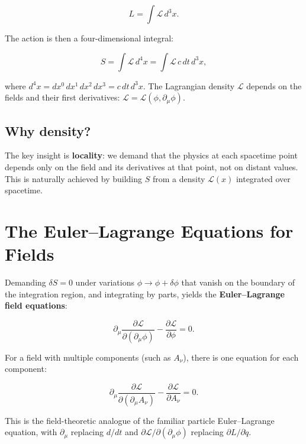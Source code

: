 \begin{equation}
L = \int \mathcal{L}\,d^3x.
\end{equation}

The action is then a four-dimensional integral:

\begin{equation}
\boxed{S = \int \mathcal{L}\,d^4x = \int \mathcal{L}\,c\,dt\,d^3x,}
\end{equation}

where $d^4x = dx^0\,dx^1\,dx^2\,dx^3 = c\,dt\,d^3x$. The Lagrangian density $\mathcal{L}$ depends on the fields and their first derivatives: $\mathcal{L} = \mathcal{L}(\phi, \partial_\mu\phi)$.

\subsection*{Why density?}

The key insight is \textbf{locality}: we demand that the physics at each spacetime point depends only on the field and its derivatives at that point, not on distant values. This is naturally achieved by building $S$ from a density $\mathcal{L}(x)$ integrated over spacetime.

\section{The Euler--Lagrange Equations for Fields}

Demanding $\delta S = 0$ under variations $\phi \to \phi + \delta\phi$ that vanish on the boundary of the integration region, and integrating by parts, yields the \textbf{Euler--Lagrange field equations}:

\begin{equation}
\boxed{\partial_\mu \frac{\partial \mathcal{L}}{\partial(\partial_\mu \phi)} - \frac{\partial \mathcal{L}}{\partial \phi} = 0.}
\end{equation}

For a field with multiple components (such as $A_\nu$), there is one equation for each component:

\begin{equation}
\partial_\mu \frac{\partial \mathcal{L}}{\partial(\partial_\mu A_\nu)} - \frac{\partial \mathcal{L}}{\partial A_\nu} = 0.
\end{equation}

This is the field-theoretic analogue of the familiar particle Euler--Lagrange equation, with $\partial_\mu$ replacing $d/dt$ and $\partial\mathcal{L}/\partial(\partial_\mu\phi)$ replacing $\partial L/\partial\dot{q}$.

